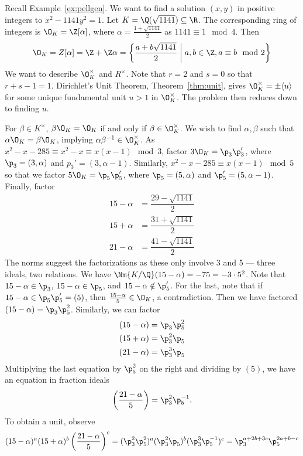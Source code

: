 \begin{ex}
Recall  Example~\ref{ex:pellgen}. We want to find a solution $(x,y)$ in positive integers to $x^2-1141y^2=1$. Let $K=\Q(\sqrt{1141}) \subseteq \R$. The corresponding ring of integers is $\O_K=\Z[\alpha]$, where $\alpha=\frac{1+\sqrt{1141}}{2}$ as $1141 \equiv 1 \mod 4$. Then
	\[
	\O_K= Z[\alpha]= \Z + \Z\alpha= \left\{ \dfrac{a+b\sqrt{1141}}{2} \;\bigg|\; a,b \in \Z, a \equiv b \mod 2 \right\}
	\]
We want to describe $\O_K^\times$ and $R^\times$. Note that $r=2$ and $s=0$ so that $r+s-1=1$. Dirichlet's Unit Theorem, Theorem~\ref{thm:unit}, gives $\O_K^\times= \pm\langle u \rangle$ for some unique fundamental unit $u>1$ in $\O_K^\times$. The problem then reduces down to finding $u$. 

For $\beta \in K^\times$, $\beta\O_K=\O_K$ if and only if $\beta \in \O_K^\times$. We wish to find $\alpha,\beta$ such that $\alpha \O_K=\beta \O_K$, implying $\alpha \beta^{-1} \in \O_K^\times$. As $x^2-x-285 \equiv x^2-x\equiv x(x-1) \mod 3$, factor $3\O_K=\p_3\p_3'$, where $\p_3=(3,\alpha)$ and $p_3'=(3,\alpha-1)$. Similarly, $x^2-x-285 \equiv x(x-1) \mod 5$ so that we factor $5\O_K= \p_5\p_5'$, where $\p_5=(5,\alpha)$ and $\p_5'=(5,\alpha-1)$. Finally, factor
	\[
	\begin{split}
	15-\alpha&= \dfrac{29-\sqrt{1141}}{2} \\
	15+\alpha&= \dfrac{31+\sqrt{1141}}{2} \\
	21-\alpha&= \dfrac{41-\sqrt{1141}}{2}
	\end{split}
	\]
The norms suggest the factorizations as these only involve 3 and 5 --- three ideals, two relations. We have $\Nm{K/\Q}(15-\alpha)= -75= -3 \cdot 5^2$. Note that $15-\alpha \in \p_3$, $15-\alpha \in \p_5$, and $15-\alpha \notin \p_5'$. For the last, note that if $15-\alpha \in \p_5\p_5'=(5)$, then $\frac{15-\alpha}{5} \in \O_K$, a contradiction. Then we have factored $(15-\alpha)=\p_3\p_5^2$. Similarly, we can factor
	\[
	\begin{split}
	(15-\alpha)&= \p_3\p_5^2 \\
	(15+\alpha)&= \p_3^2 \p_5 \\
	(21-\alpha)&= \p_3^3 \p_5
	\end{split}
	\]
Multiplying the last equation by $\p_5^2$ on the right and dividing by $(5)$, we have an equation in fraction ideals
	\[
	\left(\dfrac{21-\alpha}{5}\right) = \p_3^2 \p_5^{-1}.
	\]
To obtain a unit, observe
	\[
	(15-\alpha)^a (15+\alpha)^b \left(\dfrac{21-\alpha}{5}\right)^c= (\p_3^2\p_5^2)^a (\p_3^2\p_5)^b (\p_3^3\p_5^{-1})^c= \p_3^{a+2b+3c} \p_5^{2a+b-c}
\]
\end{ex}
